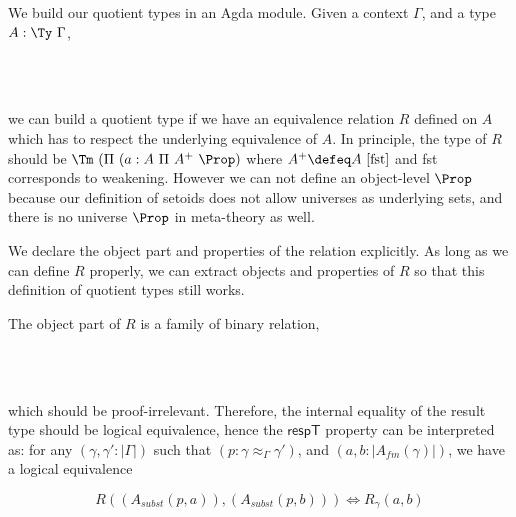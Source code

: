 We build our quotient types in an Agda module.
Given a context $\Gamma$, and a type $A : \Ty~ \Gamma$, 

\begin{code}\>\<%
\\
\>  \AgdaSymbol{(} \AgdaSymbol{:} \AgdaSymbol{)(} \AgdaSymbol{:}  \AgdaSymbol{)}\<%
\\
\end{code}

we can build a quotient type if we have an equivalence relation $R$ defined on $A$ which has to respect the underlying equivalence of $A$.
In principle, the type of $R$ should be $\Tm ~ (\Pi ~(a : A ~ \Pi ~A^{+} ~\Prop)$ where $A^{+} \defeq A ~[\text{fst}]$ and fst corresponds to weakening. However we can not define an object-level $\Prop$ because our definition of setoids does not allow universes as underlying sets, and there is no universe $\Prop$ in meta-theory as well.

 We declare the object part and properties of the relation explicitly. As long as we can define $R$ properly, we can extract objects and properties of $R$ so that this definition of quotient types still works.

The object part of $R$ is a family of binary relation, 

\begin{code}
%
\\
\>[0]\<[9]%
\>[9]\AgdaSymbol{(} \AgdaSymbol{:} \AgdaSymbol{(} \AgdaSymbol{:}   \AgdaSymbol{)}   \AgdaFunction{[}  \AgdaFunction{]fm}     \AgdaFunction{[}  \AgdaFunction{]fm}    \AgdaSymbol{)}\<%
\\
\end{code}

which should be proof-irrelevant. Therefore, the internal equality of the result type should be logical equivalence, hence the $\mathsf{respT}$ property can be interpreted as: for any $(\gamma , \gamma' : | \Gamma |)$ such that $(p : \gamma \approx_{\Gamma} \gamma')$, and $(a, b : | A_{fm}(\gamma)|)$, we have a logical equivalence


$$R ((A_{subst}(p,a)),(A_{subst}(p,b))) \iff R_{\gamma}(a,b)$$ 

